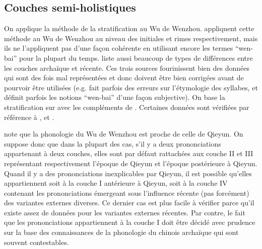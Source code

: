 \documentclass{scrbook}
\newcounter{c}[subsubsection]
\newcommand{\difwenbai}{couches archaïque et récente\xspace}
\begin{document}
\begin{sloppypar}

\subsection{Couches semi-holistiques}
On applique la méthode de la stratification au Wu de Wenzhou. \textcite{Wu2005wenzhou, Wu2006wenzhou} appliquent cette méthode au Wu de Wenzhou au niveau des initiales et rimes respectivement, mais ils ne l'appliquent pas d'une façon cohérente en utilisant encore les termes ``wen-bai'' pour la plupart du temps. \textcite[101--107]{Zhengzhang2008wenzhou} liste aussi beaucoup de types de différences entre les \difwenbai. Ces trois sources fourinissent bien des données qui sont des fois mal représentées et donc doivent être bien corrigées avant de pourvoir être utilisées (e.g. \citeauthor{Wu2006wenzhou} fait parfois des erreurs sur l'étymologie des syllabes, et \citeauthor{Zhengzhang2008wenzhou} définit parfois les notions ``wen-bai'' d'une façon subjective). On base la stratification sur \textcite{Wu2005wenzhou, Wu2006wenzhou} avec les compléments de \textcite{Zhengzhang2008wenzhou}. Certaines données sont vérifiées par référence à \textcite{You1998Wenzhou}, \textcite{Pan1998wenzhou} et \textcite[177--210]{Zhengzhang2008wenzhou}.

\textcite[19]{Zhengzhang2008wenzhou} note que la phonologie du Wu de Wenzhou est proche de celle de Qieyun. On suppose donc que dans la plupart des cas, s'il y a deux prononciations appartenant à deux couches, elles sont par défaut rattachées aux couche II et III représentant respectivement l'époque de Qieyun et l'époque postérieure à Qieyun. Quand il y a des prononciations inexplicables par Qieyun, il est possible qu'elles appartiennent soit à la couche I antérieure à Qieyun, soit à la couche IV contenant les prononciations émergeant sous l'influence récente (pas forcément) des variantes externes diverses. Ce dernier cas est plus facile à vérifier parce qu'il existe assez de données pour les variantes externes récentes. Par contre, le fait que les prononciations appartiennent à la couche I doit être décidé avec prudence sur la base des connaissances de la phonologie du chinois archaïque qui sont souvent contestables. 



\end{sloppypar}
\end{document}
